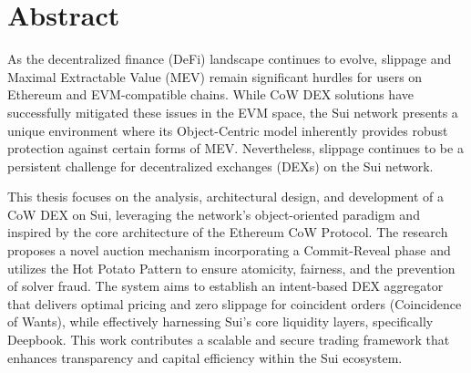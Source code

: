 \chapter*{Abstract}
\thispagestyle{empty}

As the decentralized finance (DeFi) landscape continues to evolve, slippage and Maximal Extractable Value (MEV) remain significant hurdles for users on Ethereum and EVM-compatible chains. While CoW DEX solutions have successfully mitigated these issues in the EVM space, the Sui network presents a unique environment where its Object-Centric model inherently provides robust protection against certain forms of MEV. Nevertheless, slippage continues to be a persistent challenge for decentralized exchanges (DEXs) on the Sui network.

\noindent This thesis focuses on the analysis, architectural design, and development of a CoW DEX on Sui, leveraging the network's object-oriented paradigm and inspired by the core architecture of the Ethereum CoW Protocol. The research proposes a novel auction mechanism incorporating a Commit-Reveal phase and utilizes the Hot Potato Pattern to ensure atomicity, fairness, and the prevention of solver fraud. The system aims to establish an intent-based DEX aggregator that delivers optimal pricing and zero slippage for coincident orders (Coincidence of Wants), while effectively harnessing Sui's core liquidity layers, specifically Deepbook. This work contributes a scalable and secure trading framework that enhances transparency and capital efficiency within the Sui ecosystem.

\vspace{1cm}


\vspace*{\fill}
\newpage
